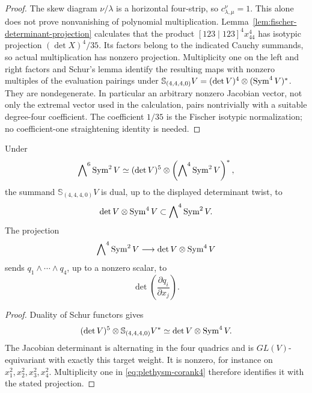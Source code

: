 \begin{proof}
The skew diagram \(\nu/\lambda\) is a horizontal four-strip, so
\(c^\nu_{\lambda,\mu}=1\).  This alone does not prove nonvanishing
of polynomial multiplication.  Lemma~\ref{lem:fischer-determinant-projection}
calculates that the product \([123\mid123]^4x_{44}^4\) has isotypic
projection \((\det X)^4/35\).  Its factors belong to the indicated
Cauchy summands, so actual multiplication has nonzero projection.
Multiplicity one on the left and right factors and Schur's lemma
identify the resulting maps with nonzero multiples of the evaluation
pairings under
\(\mathbb S_{(4,4,4,0)}V=(\det V)^4\otimes(\operatorname{Sym}^4V)^*\).
They are nondegenerate.  In particular an arbitrary nonzero Jacobian
vector, not only the extremal vector used in the calculation, pairs
nontrivially with a suitable degree-four coefficient.  The coefficient
\(1/35\) is the Fischer isotypic normalization; no coefficient-one
straightening identity is needed.
\end{proof}
\begin{lemma}
\label{lem:jacobian-projection}
Under
\[
 \bigwedge\nolimits^6\operatorname{Sym}^2V
 \simeq
 (\det V)^5\otimes
 \left(\bigwedge\nolimits^4\operatorname{Sym}^2V\right)^*,
\]
the summand
\(\mathbb S_{(4,4,4,0)}V\) is dual, up to the displayed determinant
twist, to
\[
 \det V\otimes\operatorname{Sym}^4V\subset
 \bigwedge\nolimits^4\operatorname{Sym}^2V.
\]
The projection
\[
 \bigwedge\nolimits^4\operatorname{Sym}^2V
 \longrightarrow
 \det V\otimes\operatorname{Sym}^4V
\]
sends \(q_1\wedge\cdots\wedge q_4\), up to a nonzero scalar, to
\[
 \det\left(\frac{\partial q_i}{\partial x_j}\right).
\]
\end{lemma}

\begin{proof}
Duality of Schur functors gives
\[
 (\det V)^5\otimes
 \mathbb S_{(4,4,4,0)}V^*
 \simeq
 \det V\otimes\operatorname{Sym}^4V.
\]
The Jacobian determinant is alternating in the four quadrics and is
\(GL(V)\)-equivariant with exactly this target weight.  It is nonzero,
for instance on
\(x_1^2,x_2^2,x_3^2,x_4^2\).  Multiplicity one in
\eqref{eq:plethysm-corank4} therefore identifies it with the stated
projection.
\end{proof}

